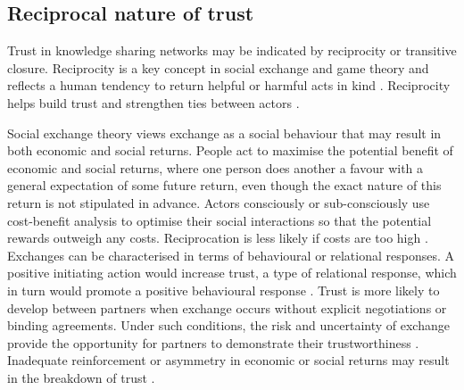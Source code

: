 \subsection{Reciprocal nature of trust}

Trust in knowledge sharing networks may be indicated by reciprocity or transitive closure. Reciprocity is a key concept in social exchange and game theory and reflects a human tendency to return helpful or harmful acts in kind \citep{nowak2005evolution}. Reciprocity helps build trust and strengthen ties between actors \citep{blau1964exchange,axelrod1984evolution}. \medskip 

Social exchange theory views exchange as a social behaviour that may result in both economic and social returns. People act to maximise the potential benefit of economic and social returns, where one person does another a favour with a general expectation of some future return, even though the exact nature of this return is not stipulated in advance. Actors consciously or sub-consciously use cost-benefit analysis to optimise their social interactions so that the potential rewards outweigh any costs. Reciprocation is less likely if costs are too high \citep{homans1961social,blau1964exchange}. Exchanges can be characterised in terms of behavioural or relational responses. A positive initiating action would increase trust, a type of relational response, which in turn would promote a positive behavioural response \citep{cropanzano2016social}. Trust is more likely to develop between partners when exchange occurs without explicit negotiations or binding agreements. Under such conditions, the risk and uncertainty of exchange provide the opportunity for partners to demonstrate their trustworthiness  \citep{molm2000risk}. Inadequate reinforcement or asymmetry in economic or social returns may result in the breakdown of trust \citep{homans1961social}. \medskip

